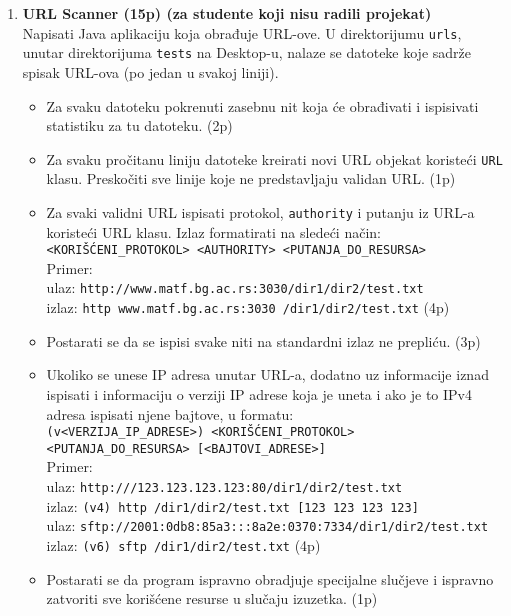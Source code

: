 \documentclass[]{article}
\begin{document}
\begin{enumerate}

\item \textbf{URL Scanner (15p) (za studente koji nisu radili projekat)}
  \\Napisati Java aplikaciju koja obrađuje URL-ove. U direktorijumu \texttt{urls}, unutar direktorijuma \texttt{tests} na Desktop-u, nalaze se datoteke koje sadrže spisak URL-ova (po jedan u svakoj liniji).
  \begin{itemize}
    \item Za svaku datoteku pokrenuti zasebnu nit koja će obrađivati i ispisivati statistiku za tu datoteku. \hfill (2p)
    \item Za svaku pročitanu liniju datoteke kreirati novi URL objekat koristeći \texttt{URL} klasu. Preskočiti sve linije koje ne predstavljaju validan URL. \hfill (1p)
    \item Za svaki validni URL ispisati protokol, \texttt{authority} i putanju iz URL-a koristeći URL klasu. Izlaz formatirati na sledeći način:\\
    \texttt{<KORIŠĆENI\_PROTOKOL> <AUTHORITY> <PUTANJA\_DO\_RESURSA>}\\
    Primer:\\
    ulaz: \texttt{http://www.matf.bg.ac.rs:3030/dir1/dir2/test.txt} \\
    izlaz: \texttt{http www.matf.bg.ac.rs:3030 /dir1/dir2/test.txt} \hfill (4p)
    \item Postarati se da se ispisi svake niti na standardni izlaz ne prepliću. \hfill (3p)
    \item Ukoliko se unese IP adresa unutar URL-a, dodatno uz informacije iznad ispisati i informaciju o verziji IP adrese koja je uneta i ako je to IPv4 adresa ispisati njene bajtove, u formatu:\\
    \texttt{(v<VERZIJA\_IP\_ADRESE>) <KORIŠĆENI\_PROTOKOL> <PUTANJA\_DO\_RESURSA> [<BAJTOVI\_ADRESE>]}\\
    Primer:\\
    ulaz: \texttt{http:///123.123.123.123:80/dir1/dir2/test.txt} \\
    izlaz: \texttt{(v4) http /dir1/dir2/test.txt [123 123 123 123]} \\
    ulaz: \texttt{sftp://2001:0db8:85a3:::8a2e:0370:7334/dir1/dir2/test.txt} \\
    izlaz: \texttt{(v6) sftp /dir1/dir2/test.txt} \hfill (4p) 
    \item Postarati se da program ispravno obradjuje specijalne slučjeve i ispravno zatvoriti sve korišćene resurse u slučaju izuzetka. \hfill (1p)
  \end{itemize}


\end{enumerate}
\end{document}
